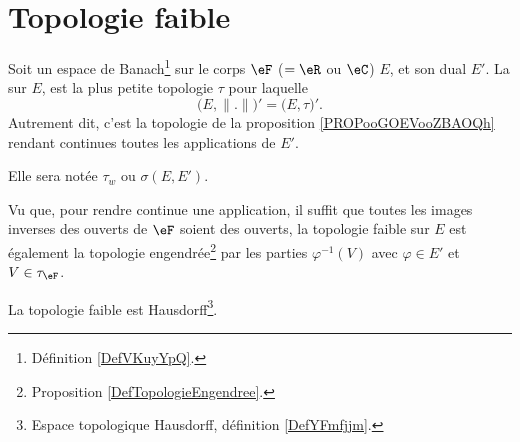 
\section{Topologie faible}

\begin{definition}        \label{DEFooZGLDooRRarRj}
	Soit un espace de Banach\footnote{Définition \ref{DefVKuyYpQ}.} sur le corps \( \eF\) (\( =\eR\) ou \( \eC\)) \( E\), et son dual \( E'\). La  sur \( E\), est la plus petite topologie \( \tau\) pour laquelle
	\begin{equation}
		\big( E,\| . \| \big)'=\big( E,\tau \big)'.
	\end{equation}
	Autrement dit, c'est la topologie de la proposition \ref{PROPooGOEVooZBAOQh} rendant continues toutes les applications de \( E'\).

	Elle sera notée \( \tau_w\) ou \( \sigma(E,E')\).
\end{definition}

Vu que, pour rendre continue une application, il suffit que toutes les images inverses des ouverts de \( \eF\) soient des ouverts, la topologie faible sur \( E\) est également la topologie engendrée\footnote{Proposition \ref{DefTopologieEngendree}.} par les parties \( \varphi^{-1}(V)\) avec \( \varphi\in E'\) et \( V\in \tau_{\eF}\).

\begin{lemma}
	La topologie faible est Hausdorff\footnote{Espace topologique Hausdorff, définition \ref{DefYFmfjjm}.}.
\end{lemma}

